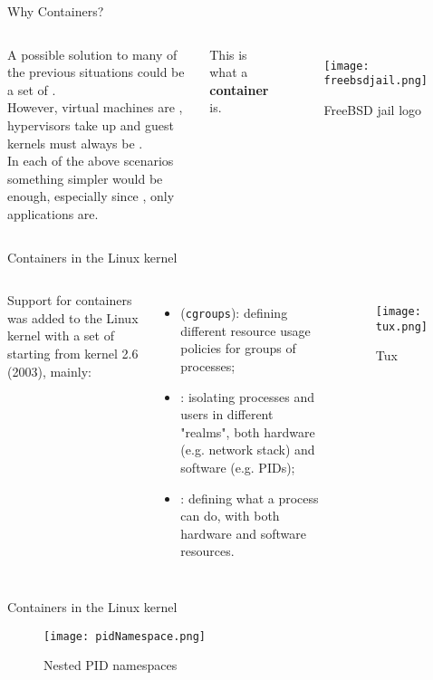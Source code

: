\begin{frame}{Why Containers?}
\begin{columns}
  A possible solution to many of the previous situations could be a set of .\\
  However, virtual machines are , hypervisors take up  and guest kernels must always be .\\
  In each of the above scenarios something simpler would be enough, especially since , only applications are.\\
  \begin{block}{}
    \centering
    This is what a \textbf{container} is.
  \end{block}

  \begin{figure}
    \centering
    \texttt{[image: freebsdjail.png]}
    \label{fig:jail}
    \caption{FreeBSD jail logo}
  \end{figure}
\end{columns}
\end{frame}

\begin{frame}{Containers in the Linux kernel}
\begin{columns}
  Support for containers was added to the Linux kernel with a set of  starting from kernel 2.6 (2003), mainly:
  \begin{itemize}
    \item {} (\texttt{cgroups}): defining different resource usage policies for groups of processes;
    \item {}: isolating processes and users in different "realms", both hardware (e.g. network stack) and software (e.g. PIDs);
    \item {}: defining what a process can do, with both hardware and software resources.
  \end{itemize}

  \begin{figure}
    \centering
    \texttt{[image: tux.png]}
    \label{fig:tux}
    \caption{Tux}
  \end{figure}
\end{columns}
\end{frame}
\begin{frame}{Containers in the Linux kernel}
\begin{figure}
  \centering
  \texttt{[image: pidNamespace.png]}
  \label{fig:pidnamespace}
  \caption{Nested PID namespaces}
\end{figure}
\end{frame}
